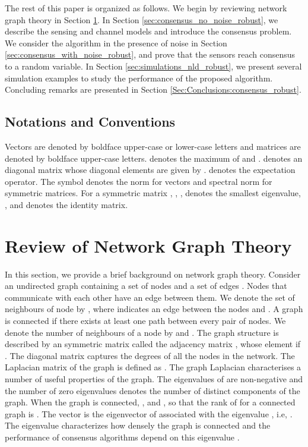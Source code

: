 \documentclass[onecolumn, draft, 12pt]{IEEEtran}
\begin{document}
The rest of this paper is organized as follows. We begin by reviewing network graph theory in Section \ref{sec:review_spectral_robust}. In Section \ref{sec:consensus_no_noise_robust}, we describe the sensing and channel models and introduce the consensus problem. We consider the  algorithm in the presence of noise in Section \ref{sec:consensus_with_noise_robust}, and prove that the sensors reach consensus to a random variable. In Section  \ref{sec:simulations_nld_robust}, we present several simulation examples to study the performance of the proposed algorithm. Concluding remarks are presented in Section \ref{Sec:Conclusions:consensus_robust}. 

\subsection*{Notations and Conventions}\label{subsec:nld_notations_robust}
Vectors are denoted by boldface upper-case or lower-case letters and matrices are denoted by boldface upper-case letters.  denotes the maximum of  and .  denotes an  diagonal matrix whose diagonal elements are given by .  denotes the expectation operator. The symbol  denotes the  norm for vectors and spectral norm for symmetric matrices. For a symmetric matrix , , , denotes the  smallest eigenvalue, , and  denotes the identity matrix. 

\section{Review of Network Graph Theory} \label{sec:review_spectral_robust}
In this section, we provide a brief background on network graph theory. Consider an undirected graph  containing a set of nodes  and a set of edges . Nodes that communicate with each other have an edge between them. We denote the set of neighbours of node  by ,  where  indicates an edge between the nodes  and  \cite{chung}. A graph is connected if there exists at least one path between every pair of nodes. We denote the number of neighbours of a node  by  and . The graph structure is described by an  symmetric matrix called the adjacency matrix , whose  element  if . The diagonal matrix  captures the degrees of all the nodes in the network. The Laplacian matrix of the graph is defined as . The graph Laplacian characterises a number of useful properties of the graph. The eigenvalues of  are non-negative and the number of zero eigenvalues denotes the number of distinct components of the graph. When the graph is connected, , and ,  so that the rank of  for a connected graph is . The vector  is the eigenvector of  associated with the eigenvalue , i.e, . The eigenvalue  characterizes how densely the graph is connected and the performance of consensus algorithms depend on this eigenvalue \cite{OlfatiSaber2004}.
\end{document}
